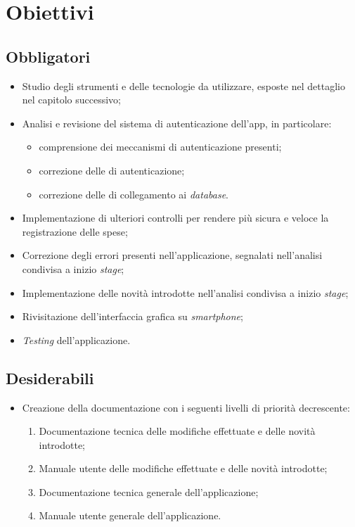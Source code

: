 \section{Obiettivi}
\label{cap:obiettivi}
\subsection{Obbligatori}

\begin{itemize}
    \item Studio degli strumenti e delle tecnologie da utilizzare, esposte nel dettaglio nel capitolo successivo;
    \item Analisi e revisione del sistema di autenticazione dell'app, in particolare:
    \begin{itemize}
        \item comprensione dei meccanismi di autenticazione presenti;
        \item correzione delle  di autenticazione;
        \item correzione delle  di collegamento ai \textit{database}.
    \end{itemize}
    \item Implementazione di ulteriori controlli per rendere più sicura e veloce la registrazione delle spese;
    \item Correzione degli errori presenti nell'applicazione, segnalati nell'analisi condivisa a inizio \textit{stage};
    \item Implementazione delle novità introdotte nell'analisi condivisa a inizio \textit{stage};
    \item Rivisitazione dell'interfaccia grafica su \textit{smartphone};
    \item \textit{Testing} dell'applicazione.
\end{itemize}

\subsection{Desiderabili}

\begin{itemize}
    \item Creazione della documentazione con i seguenti livelli di priorità decrescente:
    \begin{enumerate}
        \item Documentazione tecnica delle modifiche effettuate e delle novità introdotte;
        \item Manuale utente delle modifiche effettuate e delle novità introdotte;
        \item Documentazione tecnica generale dell'applicazione;
        \item Manuale utente generale dell'applicazione.
    \end{enumerate}
\end{itemize}

